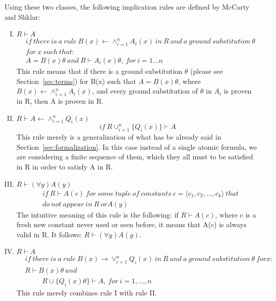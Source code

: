 Using these two classes, the following implication rules are defined by McCarty
and Shklar:
\begin{enumerate}[I)]
  \item $R \vdash A$
    \begin{equation}
      \begin{split}
        &if\ there\ is\ a\ rule\ B(x) \leftarrow \wedge^{n}_{i=1} A_i(x)\ in\ R\ and\ a\ ground\ substitution\ \theta\\
        &for\ x\ such\ that:\\
        &A=B(x)\theta\ and\ R \vdash A_i(x)\theta,\ for\ i = 1...n
      \end{split}
    \end{equation}
    This rule means that if there is a ground substitution $\theta$ (please see Section~\ref{sec:terms}) for B(x) such
    that $A=B(x)\theta$, where $B(x) \leftarrow \wedge^{n}_{i=1} A_i(x)$, and every ground substitution of $\theta$ in $A_i$ 
    is proven in R, then A is proven in R.
    \item $R \vdash A \leftarrow \wedge^{n}_{i=1} Q_i(x)$
      \begin{equation}
        if\ R \cup^n_{i=1}\{Q_i(x)\} \vdash A
      \end{equation}
      This rule merely is a generalization of what has be already said in Section~\ref{sec:formalization}.
      In this case instead of a single atomic formula, we are considering a finite sequence of them, which they
      all must to be satisfied in R in order to satisfy A in R.
      
    \item $R \vdash (\forall y) A(y)$
      \begin{equation}
        \begin{split}
          &if\ R \vdash A(c)\ for\ some\ tuple\ of\ constants\ c=\langle c_1,c_2,...,c_k\rangle\ that\\
          &do\ not\ appear\ in\ R\ or A(y)
        \end{split}
      \end{equation}
      The intuitive meaning of this rule is the following: if $R \vdash A(c)$, where c is a 
      fresh new constant never used or seen before, it means that A(c) is always valid in
      R. It follows: $R \vdash (\forall y) A(y)$.

    \item $R \vdash A$
      \begin{equation}
        \begin{split}
          &if\ there\ is\ a\ rule\ B(x) \rightarrow \vee^n_{i=1}Q_i(x)\ in\ R\ and\ a\ ground\ substitution\ \theta\ for x:\\
          &R \vdash B(x)\theta\ and\\ 
          &\ \ \ \ \ \ \ \ \ \ \ R \cup \{Q_i(x)\theta\}\vdash A,\ for\ i=1,...,n
        \end{split}
      \end{equation}
      This rule merely combines rule I with rule II.


\end{enumerate}
